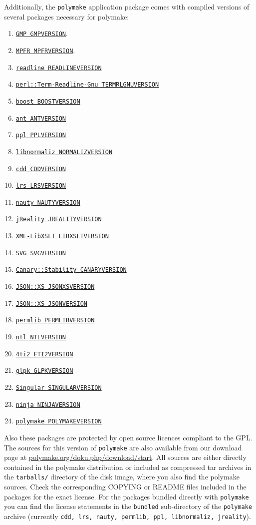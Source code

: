 \documentclass[a4paper]{amsart}
\newcommand{\polymake}{\texttt{polymake}\xspace}
\begin{document}
Additionally, the \polymake application package comes with compiled versions of several packages necessary for polymake: 
\begin{enumerate}
\item \href{GMPHOME}{\texttt{GMP GMPVERSION}}.
\item \href{MPFRHOME}{\texttt{MPFR MPFRVERSION}}.
\item \href{READLINEHOME}{\texttt{readline READLINEVERSION}}
\item \href{TERMRLGNUHOME}{\texttt{perl::Term-Readline-Gnu TERMRLGNUVERSION}}
\item \href{BOOSTHOME}{\texttt{boost BOOSTVERSION}}
\item \href{ANTHOME}{\texttt{ant ANTVERSION}}
\item \href{PPLHOME}{\texttt{ppl PPLVERSION}}
\item \href{NORMALIZHOME}{\texttt{libnormaliz NORMALIZVERSION}}
\item \href{CDDHOME}{\texttt{cdd CDDVERSION}}
\item \href{LRSHOME}{\texttt{lrs LRSVERSION}}
\item \href{NAUTYHOME}{\texttt{nauty NAUTYVERSION}}
\item \href{JREALITYHOME}{\texttt{jReality JREALITYVERSION}}
\item \href{LIBXSLTHOME}{\texttt{XML-LibXSLT LIBXSLTVERSION}}
\item \href{SVGHOME}{\texttt{SVG SVGVERSION}}
\item \href{CANARYHOME}{\texttt{Canary::Stability CANARYVERSION}}
\item \href{JSONXSHOME}{\texttt{JSON::XS JSONXSVERSION}}
\item \href{JSONHOME}{\texttt{JSON::XS JSONVERSION}}
\item \href{PERMLIBHOME}{\texttt{permlib PERMLIBVERSION}}
\item \href{NTLHOME}{\texttt{ntl NTLVERSION}}
\item \href{FTI2HOME}{\texttt{4ti2 FTI2VERSION}}
\item \href{GLPKHOME}{\texttt{glpk GLPKVERSION}}
\item \href{SINGULARHOME}{\texttt{Singular SINGULARVERSION}}
\item \href{NINJAHOME}{\texttt{ninja NINJAVERSION}}
\item \href{POLYMAKEHOME}{\texttt{polymake POLYMAKEVERSION}}
\end{enumerate}
Also these packages are protected by open source licences compliant to the GPL. The sources for this version of \polymake are also available from our download page at \href{http://polymake.org/doku.php/download/start}{polymake.org/doku.php/download/start}. All sources are either directly contained in the polymake distribution or included as compressed tar archives in the \texttt{tarballs/} directory of the disk image, where you also find the polymake sources. Check the corresponding COPYING or README files included in the packages for the exact license.  For the packages bundled directly with \polymake you can find the license statements in the \texttt{bundled} sub-directory of the \polymake archive (currently \texttt{cdd, lrs, nauty, permlib, ppl, libnormaliz, jreality}).
\end{document}
